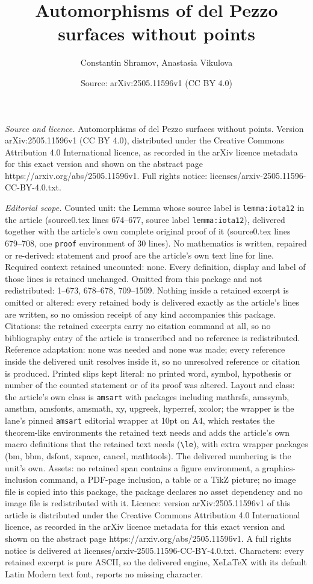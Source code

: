 \documentclass[10pt,a4paper]{amsart}
\title[Automorphisms of del Pezzo surfaces without points]{Automorphisms of del Pezzo surfaces without points}
\author{Constantin Shramov, Anastasia Vikulova}
\date{Source: arXiv:2505.11596v1 (CC BY 4.0)}
\begin{document}
\maketitle

\noindent\emph{Source and licence.} Automorphisms of del Pezzo surfaces without points. Version arXiv:2505.11596v1 (CC BY 4.0), distributed under the Creative Commons Attribution 4.0 International licence, as recorded in the arXiv licence metadata for this exact version and shown on the abstract page https://arxiv.org/abs/2505.11596v1. Full rights notice: licenses/arxiv-2505.11596-CC-BY-4.0.txt.\par\smallskip

\noindent\textit{Editorial scope.} Counted unit: the Lemma whose source label is \texttt{lemma:iota12} in the article (source0.tex lines 674--677, source label \texttt{lemma:iota12}), delivered together with the article's own complete original proof of it (source0.tex lines 679--708, one \texttt{proof} environment of 30 lines). No mathematics is written, repaired or re-derived: statement and proof are the article's own text line for line. Required context retained uncounted: none. Every definition, display and label of those lines is retained unchanged. Omitted from this package and not redistributed: 1--673, 678--678, 709--1509. Nothing inside a retained excerpt is omitted or altered: every retained body is delivered exactly as the article's lines are written, so no omission receipt of any kind accompanies this package. Citations: the retained excerpts carry no citation command at all, so no bibliography entry of the article is transcribed and no reference is redistributed. Reference adaptation: none was needed and none was made; every reference inside the delivered unit resolves inside it, so no unresolved reference or citation is produced. Printed slips kept literal: no printed word, symbol, hypothesis or number of the counted statement or of its proof was altered. Layout and class: the article's own class is \texttt{amsart} with packages including mathrsfs, amssymb, amsthm, amsfonts, amsmath, xy, upgreek, hyperref, xcolor; the wrapper is the lane's pinned \texttt{amsart} editorial wrapper at 10pt on A4, which restates the theorem-like environments the retained text needs and adds the article's own macro definitions that the retained text needs (\texttt{\textbackslash le}), with extra wrapper packages (bm, bbm, dsfont, xspace, cancel, mathtools). The delivered numbering is the unit's own. Assets: no retained span contains a figure environment, a graphics-inclusion command, a PDF-page inclusion, a table or a TikZ picture; no image file is copied into this package, the package declares no asset dependency and no image file is redistributed with it. Licence: version arXiv:2505.11596v1 of this article is distributed under the Creative Commons Attribution 4.0 International licence, as recorded in the arXiv licence metadata for this exact version and shown on the abstract page https://arxiv.org/abs/2505.11596v1. A full rights notice is delivered at licenses/arxiv-2505.11596-CC-BY-4.0.txt. Characters: every retained excerpt is pure ASCII, so the delivered engine, XeLaTeX with its default Latin Modern text font, reports no missing character.
\end{document}
